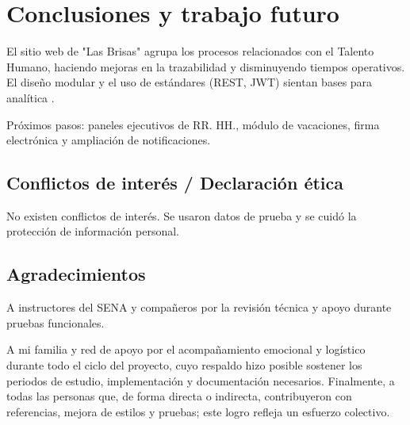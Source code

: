 \section{Conclusiones y trabajo futuro}

El sitio web de "Las Brisas" agrupa los procesos relacionados con el Talento Humano, haciendo mejoras en la trazabilidad y disminuyendo tiempos operativos. El diseño modular y el uso de estándares (REST, JWT) sientan bases para analítica \cite{implementacion_microservicios}.

Próximos pasos: paneles ejecutivos de RR. HH., módulo de vacaciones, firma electrónica y ampliación de notificaciones.

\subsection{Conflictos de interés / Declaración ética}
No existen conflictos de interés. Se usaron datos de prueba y se cuidó la protección de información personal.

\subsection{Agradecimientos}
A instructores del SENA y compañeros por la revisión técnica y apoyo durante pruebas funcionales.

A mi familia y red de apoyo por el acompañamiento emocional y logístico durante todo el ciclo del proyecto, cuyo respaldo hizo posible sostener los periodos de estudio, implementación y documentación necesarios. Finalmente, a todas las personas que, de forma directa o indirecta, contribuyeron con referencias, mejora de estilos y pruebas; este logro refleja un esfuerzo colectivo.